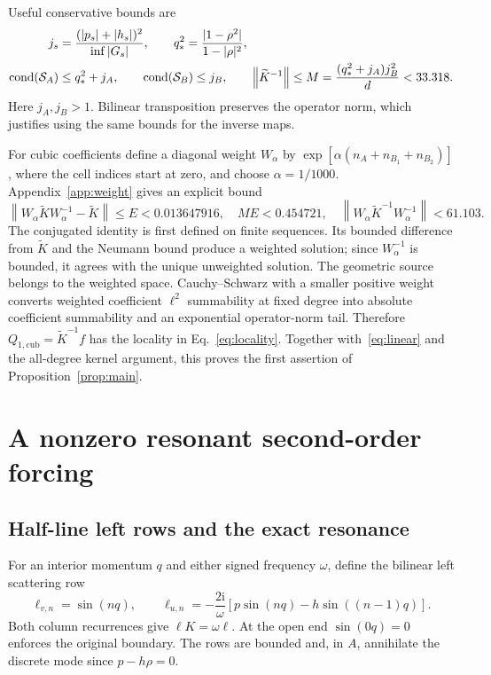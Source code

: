 \documentclass[11pt,a4paper]{article}
\newcommand{\ii}{\mathrm{i}}
\newcommand{\cond}{\operatorname{cond}}
\newcommand{\norm}[1]{\left\lVert#1\right\rVert}
\begin{document}
Useful conservative bounds are
\begin{align}
 j_s&=\frac{(|p_s|+|h_s|)^2}{\inf|G_s|},\qquad
 q_*^2=\frac{|1-\rho^2|}{1-|\rho|^2},\notag\\
 \cond(\mathcal S_A)&\leq q_*^2+j_A,\qquad
 \cond(\mathcal S_B)\leq j_B,\qquad
 \norm{\widetilde K^{-1}}\leq M=\frac{(q_*^2+j_A)j_B^2}{d}<33.318.
 \label{eq:inverse}
\end{align}
Here $j_A,j_B>1$. Bilinear transposition preserves the operator norm,
which justifies using the same bounds for the inverse maps.

For cubic coefficients define a diagonal weight $W_\alpha$ by
$\exp[\alpha(n_A+n_{B_1}+n_{B_2})]$, where the cell indices start at
zero, and choose $\alpha=1/1000$. Appendix~\ref{app:weight} gives an
explicit bound
\begin{equation}
 \norm{W_\alpha\widetilde K W_\alpha^{-1}-\widetilde K}
 \leq E<0.013647916,\quad ME<0.454721,\quad
 \norm{W_\alpha\widetilde K^{-1}W_\alpha^{-1}}<61.103.
 \label{eq:weighted}
\end{equation}
The conjugated identity is first defined on finite sequences. Its bounded
difference from $\widetilde K$ and the Neumann bound produce a weighted
solution; since $W_\alpha^{-1}$ is bounded, it agrees with the unique
unweighted solution. The geometric source belongs to the weighted space.
Cauchy--Schwarz with a smaller positive weight converts weighted coefficient
$\ell^2$ summability at fixed degree into absolute coefficient summability
and an exponential operator-norm tail. Therefore
$Q_{1,\mathrm{cub}}=\widetilde K^{-1}f$ has the locality in
Eq.~\eqref{eq:locality}. Together with~\eqref{eq:linear} and the
all-degree kernel argument, this proves the first assertion of
Proposition~\ref{prop:main}.

\section{A nonzero resonant second-order forcing}
\subsection{Half-line left rows and the exact resonance}
For an interior momentum $q$ and either signed frequency $\omega$, define
the bilinear left scattering row
\begin{equation}
 \ell_{v,n}=\sin(nq),\qquad
 \ell_{u,n}=-\frac{2\ii}{\omega}
       [p\sin(nq)-h\sin((n-1)q)].\label{eq:rows}
\end{equation}
Both column recurrences give $\ell K=\omega\ell$. At the open end
$\sin(0q)=0$ enforces the original boundary. The rows are bounded and,
in $A$, annihilate the discrete mode since $p-h\rho=0$.
\end{document}
